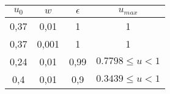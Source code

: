 \begin{table}[H]
    \centering
    \begin{tabular}{c c c c} 
        $u_0$ & $w$ & $\epsilon$ & $u_{max}$ \\
        \toprule
        \toprule
        0,37 & 0,01 & 1 & 1 \\
        \midrule
        0,37 & 0,001 & 1 & 1 \\
        \midrule
        0,24 & 0,01 & 0,99 & $0.7798 \leq u < 1$ \\
        \midrule
        0,4 & 0,01 & 0,9 & $0.3439 \leq u < 1$ \\
        \bottomrule
    \end{tabular}
\end{table}

%